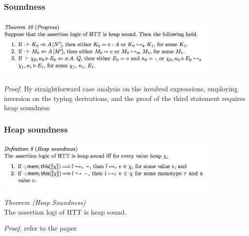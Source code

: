 \documentclass[xcolor=dvipsnames,9pt,hide notes,mathserif]{beamer}
\begin{document}
\begin{frame}
  \frametitle{Soundness}
\begin{center}
 \includegraphics[width=11cm, height=3cm]{inputs/progress}
\end{center}
\textit{Proof.} By straightforward case analysis on the involved
expressions, employing inversion on the typing derivations, and the
proof of the third statement requires heap soundness 


\end{frame}



\begin{frame}
  \frametitle{Heap soundness}
\begin{center}
  \includegraphics[width=11cm, height=2.5cm]{inputs/heap_soundness}
\end{center}

\textit{Theorem (Heap Soundness)}\\
The assertion logi of HTT is heap sound.
\vskip0.3cm

\textit{Proof.} refer to the paper
\end{frame}
\end{document}
